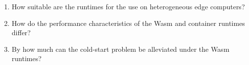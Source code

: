 \begin{enumerate}




  \item How suitable are the runtimes for the use on heterogeneous edge computers?

  \item How do the performance characteristics of the Wasm and container runtimes differ?

  \item By how much can the cold-start problem be alleviated under the Wasm runtimes?

\end{enumerate}